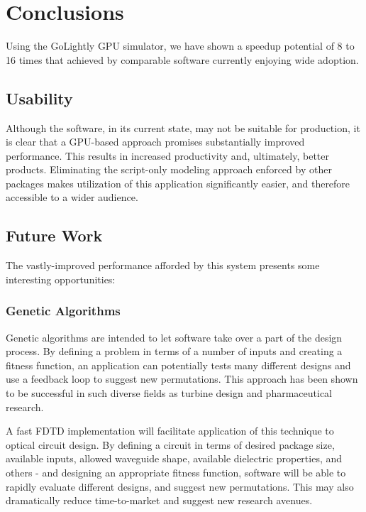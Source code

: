 \chapter{Conclusions} \label{ch:conclusions}

Using the GoLightly GPU simulator, we have shown a speedup potential of 8 to 16 times that achieved by comparable software currently enjoying wide adoption. 

\section{Usability}

Although the software, in its current state, may not be suitable for production, it is clear that a GPU-based approach promises substantially improved performance. This results in increased productivity and, ultimately, better products. Eliminating the script-only modeling approach enforced by other packages makes utilization of this application significantly easier, and therefore accessible to a wider audience.

\section{Future Work}

The vastly-improved performance afforded by this system presents some interesting opportunities:

\subsection{Genetic Algorithms}
Genetic algorithms are intended to let software take over a part of the design process. By defining a problem in terms of a number of inputs and creating a fitness function, an application can potentially tests many different designs and use a feedback loop to suggest new permutations. This approach has been shown to be successful in such diverse fields as turbine design and pharmaceutical research. 

A fast FDTD implementation will facilitate application of this technique to optical circuit design. By defining a circuit in terms of desired package size, available inputs, allowed waveguide shape, available dielectric properties, and others - and designing an appropriate fitness function, software will be able to rapidly evaluate different designs, and suggest new permutations. This may also dramatically reduce time-to-market and suggest new research avenues. 

